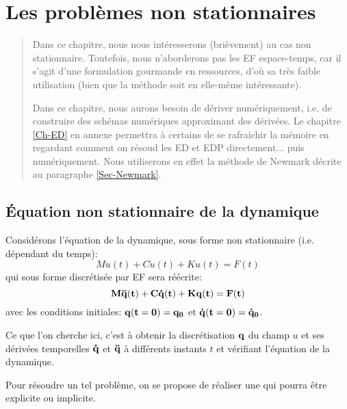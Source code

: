 \chapter{Les problèmes non stationnaires}\label{Ch-temps}
\begin{abstract}
Dans ce chapitre, nous nous intéresserons (brièvement) au cas non stationnaire.
Toutefois, nous n'aborderons pas les EF espace-temps, car il s'agit d'une formulation
gourmande en ressources, d'où sa très faible utilisation (bien que la méthode
soit en elle-même intéressante).

Dans ce chapitre, nous aurons besoin de \og dériver numériquement\fg{}, i.e. de
construire des schémas numériques approximant des dérivées. 
Le chapitre \ref{Ch-ED} en annexe permettra à certains de se rafraichir la mémoire
en regardant comment on résoud les ED et EDP directement... puis numériquement.
Nous utiliserons en effet la méthode de Newmark
 décrite au paragraphe \ref{Sec-Newmark}.
\end{abstract}



\medskip
\section{Équation non stationnaire de la dynamique}

Considérons l'équation de la dynamique, sous forme non stationnaire (i.e. dépendant du temps):
\begin{equation} M \ddot u(t) + C \dot u(t) + K u(t)= F(t) \end{equation}
qui sous forme discrétisée par EF sera réécrite:
\begin{equation}\colorblue \MM{M}\VV{\ddot q(t)} +  \MM{C}\VV{\dot q(t)} + \MM{K}\VV{q(t)}= \VV{F(t)} \end{equation}
avec les conditions initiales: $\mathbf{q(t=0)}=\mathbf{q_0}$ et $\mathbf{\dot q(t=0)}=\mathbf{\dot q_0}$.

\medskip
Ce que l'on cherche ici, c'est à obtenir la discrétisation $\mathbf{q}$ du champ $u$ et ses dérivées
temporelles $\mathbf{\dot q}$ et $\mathbf{\ddot q}$ à différents instants $t$ et vérifiant l'équation de la dynamique.

\medskip
Pour résoudre un tel problème, on se propose de réaliser une  qui pourra être explicite ou implicite.

